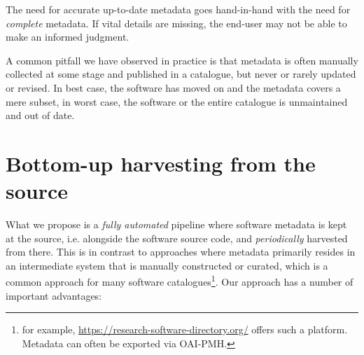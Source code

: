 \documentclass[a4paper,11pt]{article}
\begin{document}
The need for accurate up-to-date metadata goes hand-in-hand with the need for
\emph{complete} metadata. If vital details are missing, the
end-user may not be able to make an informed judgment.

A common pitfall we have observed in practice is that metadata is often
manually collected at some stage and published in a catalogue, but never or
rarely updated or revised. In best case, the software has moved on and the
metadata covers a mere subset, in worst case, the software or the entire
catalogue is unmaintained and out of date.

\section{Bottom-up harvesting from the source}

What we propose is a \emph{fully automated} pipeline where software metadata is
kept at the source, i.e. alongside the software source code, and
\emph{periodically} harvested from there. This is in contrast to approaches
where metadata primarily resides in an intermediate system that is manually
constructed or curated, which is a common approach for many
software catalogues\footnote{for example, \url{https://research-software-directory.org/}
offers such a platform. Metadata can often be exported via OAI-PMH.}. Our approach has a number of important advantages:
\end{document}
